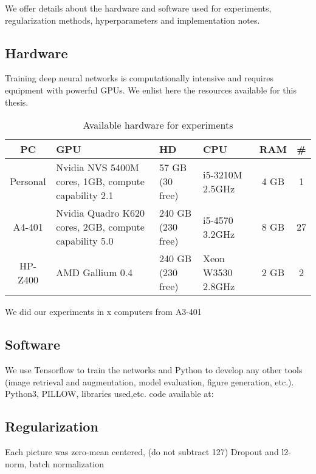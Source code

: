 We offer details about the hardware and software used for experiments, regularization methods, hyperparameters and implementation notes.

\subsection{Hardware}
Training deep neural networks is computationally intensive and requires equipment with powerful GPUs. We enlist here the resources available for this thesis.
\begin{table}[h]
	\centering
	\begin{tabular}{cp{3.8cm}p{1.7cm}p{1.8cm}cc}
	\hline
	\textbf{PC}	& \textbf{GPU}	& \textbf{HD}	& \textbf{CPU}	& \textbf{RAM}	& \textbf{\#} \\
	\hline
	Personal	& Nvidia NVS 5400M \newline 96 cores, 1GB, compute capability 2.1 & 57 GB \newline (30 free)	& i5-3210M \newline 2.5GHz	& 4 GB	& 1 \\
	A4-401	& Nvidia Quadro K620 \newline 384 cores, 2GB, compute capability 5.0 & 240 GB \newline (230 free)	& i5-4570 \newline 3.2GHz	& 8 GB	& 27\\
	HP-Z400	& AMD Gallium 0.4  & 240 GB \newline (230 free)	& Xeon W3530 \newline 2.8GHz	& 2 GB	& 2\\
	\hline
	\end{tabular}
	\caption{Available hardware for experiments}
\end{table}
We did our experiments in x computers from A3-401

\subsection{Software}
We use Tensorflow to train the networks and Python to develop any other tools (image retrieval and augmentation, model evaluation, figure generation, etc.).
Python3, PILLOW, libraries used,etc.
code available at:

\subsection{Regularization}
Each picture was zero-mean centered, (do not subtract 127)
Dropout and l2-norm, batch normalization


